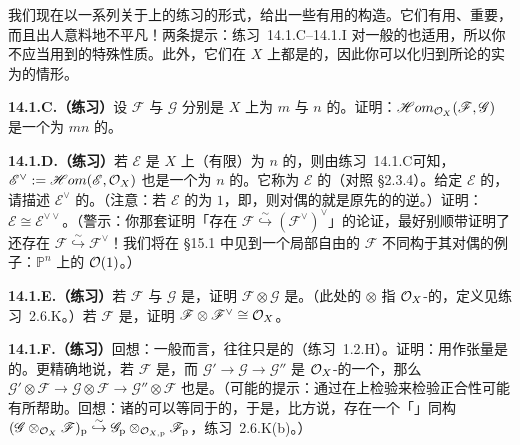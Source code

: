 我们现在以一系列关于\trScheme{}上\trLocallyFreeSheaf{}的练习的形式，给出一些有用的构造。它们有用、重要，而且出人意料地不平凡！两条提示：\mbox{练习~14.1.C--14.1.I} 对一般的\trRingedSpace{}也适用，所以你不应当用到\trScheme{}的特殊性质。此外，它们在 $X$ 上都是\trLocally{}的，因此你可以化归到所论的\trLocallyFreeSheaf{}实为\trFreeSheaf{}的情形。

\textbf{14.1.C.（练习）}\quad 设 $\mathscr{F}$ 与 $\mathscr{G}$ 分别是 $X$ 上\trRank{}为 $m$ 与 $n$ 的\trLocallyFreeSheaf。证明：$\mathscr{H}om_{\mathcal{O}_X}(\mathscr{F},\mathscr{G})$ 是一个\trRank{}为 $mn$ 的\trLocallyFreeSheaf。

\textbf{14.1.D.（练习）}\quad 若 $\mathscr{E}$ 是 $X$ 上（有限）\trRank{}为 $n$ 的\trLocallyFreeSheaf，则由\mbox{练习~14.1.C}可知，$\mathscr{E}^{\vee}:=\mathscr{H}om(\mathscr{E},\mathcal{O}_X)$ 也是一个\trRank{}为 $n$ 的\trLocallyFreeSheaf。它称为 $\mathscr{E}$ 的\trDual（对照 \S2.3.4）。给定 $\mathscr{E}$ 的\trTransitionFunction{}，请描述 $\mathscr{E}^{\vee}$ 的\trTransitionFunction。（注意：若 $\mathscr{E}$ 的\trRank{}为 $1$，即\trInvertible，则对偶的\trTransitionFunction{}就是原先的\trTransitionFunction{}的逆。）证明：$\mathscr{E}\cong\mathscr{E}^{\vee\vee}$。（警示：你那套证明「存在\trCanonical{}\trIsomorphism{} $\mathscr{F}\overset{\sim}{\hookrightarrow}(\mathscr{F}^{\vee})^{\vee}$」的论证，最好别顺带证明了还存在\trIsomorphism{} $\mathscr{F}\overset{\sim}{\hookrightarrow}\mathscr{F}^{\vee}$！我们将在 \S15.1 中见到一个局部自由的 $\mathscr{F}$ 不同构于其对偶的例子：$\mathbb{P}^n$ 上的\trInvertibleSheaf{} $\mathcal{O}(1)$。）

\textbf{14.1.E.（练习）}\quad 若 $\mathscr{F}$ 与 $\mathscr{G}$ 是\trLocallyFreeSheaf，证明 $\mathscr{F}\otimes\mathscr{G}$ 是\trLocallyFreeSheaf。（此处的 $\otimes$ 指 $\mathcal{O}_X$-\trModule{}的\trTensorProduct，定义见\mbox{练习~2.6.K}。）若 $\mathscr{F}$ 是\trInvertibleSheaf，证明 $\mathscr{F}\otimes\mathscr{F}^{\vee}\cong\mathcal{O}_X$。

\textbf{14.1.F.（练习）}\quad 回想：一般而言，\trTensorProduct{}往往只是\trRightExact{}的（\mbox{练习~1.2.H}）。证明：用\trLocallyFreeSheaf{}作张量是\trExact{}的。更精确地说，若 $\mathscr{F}$ 是\trLocallyFreeSheaf，而 $\mathscr{G}'\to\mathscr{G}\to\mathscr{G}''$ 是 $\mathcal{O}_X$-\trModule{}的一个\trExactSequence，那么 $\mathscr{G}'\otimes\mathscr{F}\to\mathscr{G}\otimes\mathscr{F}\to\mathscr{G}''\otimes\mathscr{F}$ 也是。（可能的提示：通过在\trStalk{}上检验\trExactness{}来检验正合性可能有所帮助。回想：诸\trStalk{}的\trTensorProduct{}可以等同于\trTensorProduct{}的\trStalk，于是，比方说，存在一个「\trNatural」同构 $(\mathscr{G}\otimes_{\mathcal{O}_X}\mathscr{F})_{\mathrm{p}}\overset{\sim}{\hookrightarrow}\mathscr{G}_{\mathrm{p}}\otimes_{\mathcal{O}_{X,\mathrm{p}}}\mathscr{F}_{\mathrm{p}}$，\mbox{练习~2.6.K}(b)。）


